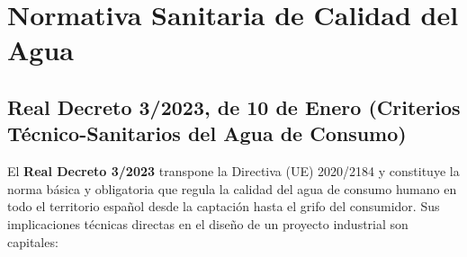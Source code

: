 \documentclass{report}
\begin{document}
\section{Normativa Sanitaria de Calidad del Agua}

\subsection{Real Decreto 3/2023, de 10 de Enero (Criterios Técnico-Sanitarios del Agua de Consumo)}
El \textbf{Real Decreto 3/2023} \cite{RD3_2023} transpone la Directiva (UE) 2020/2184 y constituye la norma básica y obligatoria que regula la calidad del agua de consumo humano en todo el territorio español desde la captación hasta el grifo del consumidor. Sus implicaciones técnicas directas en el diseño de un proyecto industrial son capitales:
\end{document}
